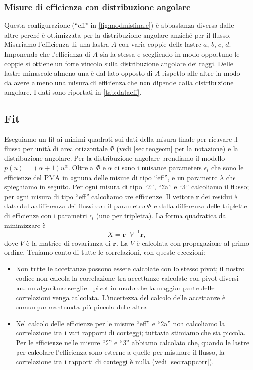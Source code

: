 \subsubsection{Misure di efficienza con distribuzione angolare}

Questa configurazione (``eff'' in \autoref{fig:modmisfinale})
è abbastanza diversa dalle altre perché è ottimizzata per la distribuzione angolare anziché per il flusso.
Misuriamo l'efficienza di una lastra $A$ con varie coppie delle lastre $a$, $b$, $c$, $d$.
Imponendo che l'efficienza di $A$ sia la stessa e scegliendo in modo opportuno le coppie
si ottiene un forte vincolo sulla distribuzione angolare dei raggi.
Delle lastre minuscole almeno una è dal lato opposto di $A$ rispetto alle altre in modo
da avere almeno una misura di efficienza che non dipende dalla distribuzione angolare.
I dati sono riportati in \autoref{tab:dataeff}.

\subsection{Fit}

Eseguiamo un fit ai minimi quadrati sui dati della misura finale
per ricavare il flusso per unità di area orizzontale $\Phi$
(vedi \autoref{sec:teogeom} per la notazione) e la distribuzione angolare.
Per la distribuzione angolare prendiamo il modello $p(u) = (\alpha+1) u^\alpha$.
Oltre a $\Phi$ e $\alpha$ ci sono i nuisance parameters $\epsilon_i$
che sono le efficienze del PMA in ognuna delle misure di tipo ``eff'',
e un parametro $\lambda$ che spieghiamo in seguito.
Per ogni misura di tipo ``2'', ``2a'' e ``3'' calcoliamo il flusso;
per ogni misura di tipo ``eff'' calcoliamo tre efficienze.
Il vettore $\mathbf r$ dei residui è dato dalla differenza dei flussi con il parametro $\Phi$
e dalla differenza delle triplette di efficienze con i parametri $\epsilon_i$ (uno per tripletta).
La forma quadratica da minimizzare è
\begin{equation*}
	X = \mathbf r^\top V^{-1} \mathbf r,
\end{equation*}
dove $V$ è la matrice di covarianza di $\mathbf r$.
La $V$ è calcolata con propagazione al primo ordine.
Teniamo conto di tutte le correlazioni, con queste eccezioni:
\begin{itemize}
	\item Non tutte le accettanze possono essere calcolate con lo stesso pivot;
	il nostro codice non calcola la correlazione tra accettanze calcolate con pivot diversi
	ma un algoritmo sceglie i pivot in modo che la maggior parte delle correlazioni venga calcolata.
	L'incertezza del calcolo delle accettanze è comunque mantenuta più piccola delle altre.
	\item Nel calcolo delle efficienze per le misure ``eff'' e ``2a''
	non calcoliamo la correlazione tra i vari rapporti di conteggi;
	tuttavia stimiamo che sia piccola.
	Per le efficienze nelle misure ``2'' e ``3'' abbiamo calcolato che,
	quando le lastre per calcolare l'efficienza sono esterne a quelle per misurare il flusso,
	la correlazione tra i rapporti di conteggi è nulla (vedi \autoref{sec:rappcorr}).
\end{itemize}

